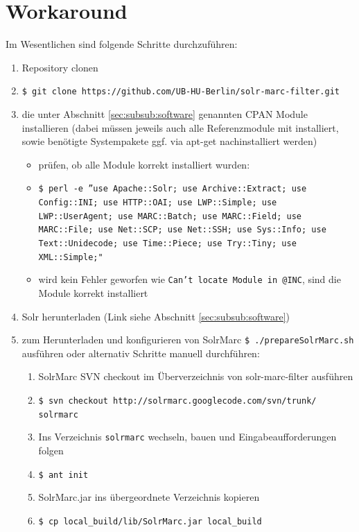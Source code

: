\documentclass[10pt]{article}
\begin{document}
\section{Workaround}
\label{sec:workaround}
Im Wesentlichen sind folgende Schritte durchzuführen: 
\begin{enumerate}
	\item Repository clonen
	\item[] \texttt{\$ git clone https://github.com/UB-HU-Berlin/solr-marc-filter.git}
	\item die unter Abschnitt \ref{sec:subsub:software} genannten CPAN Module installieren (dabei müssen jeweils auch alle Referenzmodule mit installiert, sowie benötigte Systempakete ggf. via apt-get nachinstalliert werden)
	\begin{itemize}
		\item prüfen, ob alle Module korrekt installiert wurden: 
		\item[] \texttt{\$ perl -e ”use Apache::Solr; use Archive::Extract; use Config::INI; use HTTP::OAI; use LWP::Simple; use LWP::UserAgent; use MARC::Batch; use MARC::Field; use MARC::File; use Net::SCP; use Net::SSH; use Sys::Info; use Text::Unidecode; use Time::Piece; use Try::Tiny; use XML::Simple;" }
		\item wird kein Fehler geworfen wie \texttt{Can't locate Module in @INC}, sind die Module korrekt installiert
	\end{itemize}
	\item Solr herunterladen (Link siehe Abschnitt \ref{sec:subsub:software})
	\item zum Herunterladen und konfigurieren von SolrMarc \texttt{\$ ./prepareSolrMarc.sh} ausführen oder alternativ Schritte manuell durchführen:
	\begin{enumerate}
		\item SolrMarc SVN checkout im Überverzeichnis von solr-marc-filter ausführen
		\item[] \texttt{\$ svn checkout http://solrmarc.googlecode.com/svn/trunk/ solrmarc}
		
		\item Ins Verzeichnis \texttt{solrmarc} wechseln, bauen und Eingabeaufforderungen folgen
		\item[] \texttt{\$ ant init}
		
		\item SolrMarc.jar ins übergeordnete Verzeichnis kopieren
		\item[] \texttt{\$ cp local\_build/lib/SolrMarc.jar local\_build}
		

\end{enumerate}
\end{enumerate}
\end{document}
